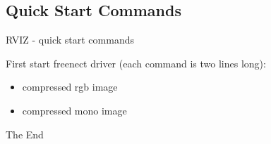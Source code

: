 \documentclass{beamer}
\begin{document}
\subsection{Quick Start Commands}
\begin{frame}{RVIZ - quick start commands}	

	First start freenect driver (each command is two lines long):\\
	
			 	

	\begin{itemize}
		
		\item compressed rgb image \\
			 	
		
		\item compressed mono image \\
			 	
		
	\end{itemize}
\end{frame}


\begin{frame}
\Huge{\centerline{The End}}
\end{frame}
\end{document}
